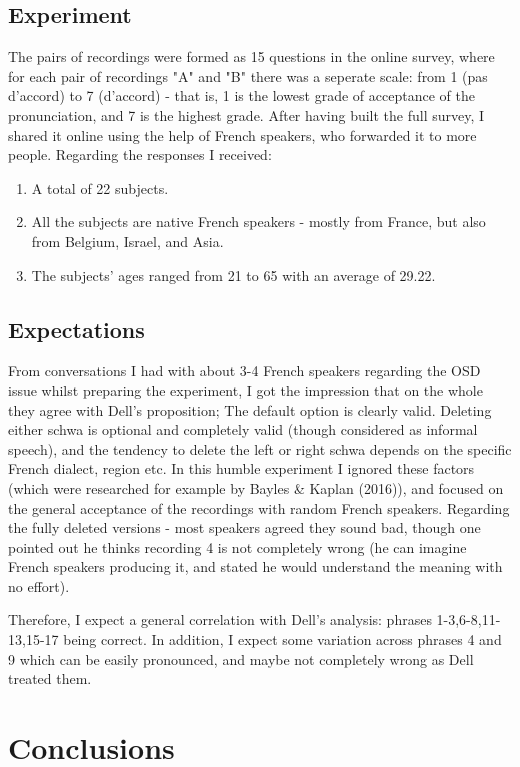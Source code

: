\documentclass{article}
\begin{document}
\subsection{Experiment}
The pairs of recordings were formed as 15 questions in the online survey, where for each pair of recordings "A" and "B" there was a seperate scale: from 1 (pas d'accord) to 7 (d'accord) - that is, 1 is the lowest grade of acceptance of the pronunciation, and 7 is the highest grade. After having built the full survey,  I shared it online using the help of French speakers, who forwarded it to more people.  
Regarding the responses I received:
\begin{enumerate}
  \item A total of 22 subjects.
  \item All the subjects are native French speakers - mostly from France, but also from Belgium, Israel,  and Asia.
  \item The subjects’ ages ranged from 21 to 65 with an average of 29.22.
\end{enumerate}

\subsection{Expectations}
From conversations I had with about 3-4 French speakers regarding the OSD issue whilst preparing the experiment,  I got the impression that on the whole they agree with Dell's proposition; The default option is clearly valid. Deleting either schwa is optional and completely valid (though considered as informal speech), and the tendency to delete the left or right schwa depends on the specific French dialect, region etc. In this humble experiment I ignored these factors (which were researched for example by Bayles \& Kaplan (2016)), and focused on the general acceptance of the recordings with random French speakers. 
Regarding the fully deleted versions - most speakers agreed they sound bad, though one pointed out he thinks recording 4 is not completely wrong (he can imagine French speakers producing it, and stated he would understand the meaning with no effort). 

Therefore, I expect a general correlation with Dell's analysis: phrases 1-3,6-8,11-13,15-17 being correct. In addition, I expect some variation across phrases 4 and 9 which can be easily pronounced, and maybe not completely wrong as Dell treated them. 

\section{Conclusions} %
\end{document}
